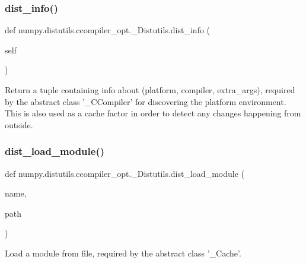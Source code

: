 \subsubsection{\texorpdfstring{dist\+\_\+info()}{dist\_info()}}
{\footnotesize\ttfamily def numpy.\+distutils.\+ccompiler\+\_\+opt.\+\_\+\+Distutils.\+dist\+\_\+info (\begin{DoxyParamCaption}\item[{}]{self }\end{DoxyParamCaption})}

\begin{DoxyVerb}Return a tuple containing info about (platform, compiler, extra_args),
required by the abstract class '_CCompiler' for discovering the
platform environment. This is also used as a cache factor in order
to detect any changes happening from outside.
\end{DoxyVerb}
 \mbox{\label{classnumpy_1_1distutils_1_1ccompiler__opt_1_1__Distutils_a5460fdb52867389a9b385f538755bda9}} 
\subsubsection{\texorpdfstring{dist\+\_\+load\+\_\+module()}{dist\_load\_module()}}
{\footnotesize\ttfamily def numpy.\+distutils.\+ccompiler\+\_\+opt.\+\_\+\+Distutils.\+dist\+\_\+load\+\_\+module (\begin{DoxyParamCaption}\item[{}]{name,  }\item[{}]{path }\end{DoxyParamCaption})\hspace{0.3cm}{\ttfamily [static]}}

\begin{DoxyVerb}Load a module from file, required by the abstract class '_Cache'.\end{DoxyVerb}
 \mbox{\label{classnumpy_1_1distutils_1_1ccompiler__opt_1_1__Distutils_af73467a9b36866d0311004df5dcd3ffa}} 
